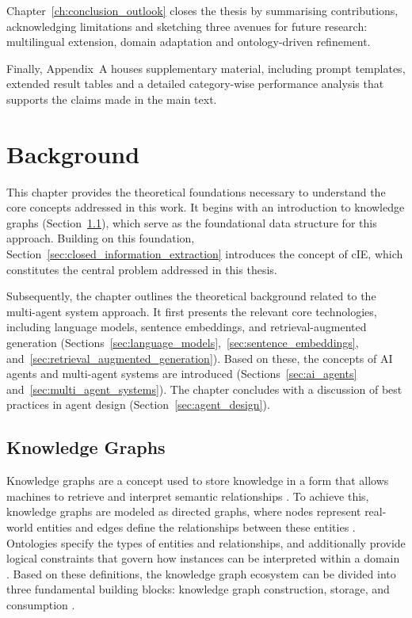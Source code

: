 \documentclass[a4paper,oneside,bibliography=totoc]{scrbook}
\begin{document}
Chapter~\ref{ch:conclusion_outlook} closes the thesis by summarising contributions, acknowledging limitations and sketching three avenues for future research: multilingual extension, domain adaptation and ontology-driven refinement.

Finally, Appendix~A houses supplementary material, including prompt templates, extended result tables and a detailed category-wise performance analysis that supports the claims made in the main text.

\chapter{Background}
\label{ch:background}

This chapter provides the theoretical foundations necessary to understand the core concepts addressed in this work. It begins with an introduction to knowledge graphs (Section~\ref{sec:knowledge_graphs}), which serve as the foundational data structure for this approach. Building on this foundation, Section~\ref{sec:closed_information_extraction} introduces the concept of \ac{cIE}, which constitutes the central problem addressed in this thesis.

Subsequently, the chapter outlines the theoretical background related to the multi-agent system approach. It first presents the relevant core technologies, including language models, sentence embeddings, and retrieval-augmented generation (Sections~\ref{sec:language_models},~\ref{sec:sentence_embeddings}, and~\ref{sec:retrieval_augmented_generation}). Based on these, the concepts of \ac{AI} agents and multi-agent systems are introduced (Sections~\ref{sec:ai_agents} and~\ref{sec:multi_agent_systems}). The chapter concludes with a discussion of best practices in agent design (Section~\ref{sec:agent_design}).


\section{Knowledge Graphs}
\label{sec:knowledge_graphs}

Knowledge graphs are a concept used to store knowledge in a form that allows machines to retrieve and interpret semantic relationships \cite{GomezPerez2017}. To achieve this, knowledge graphs are modeled as directed graphs, where nodes represent real-world entities and edges define the relationships between these entities \cite{Paulheim2016}. Ontologies specify the types of entities and relationships, and additionally provide logical constraints that govern how instances can be interpreted within a domain \cite{GomezPerez2017,Paulheim2016}. Based on these definitions, the knowledge graph ecosystem can be divided into three fundamental building blocks: knowledge graph construction, storage, and consumption \cite{GomezPerez2017}.
\end{document}
